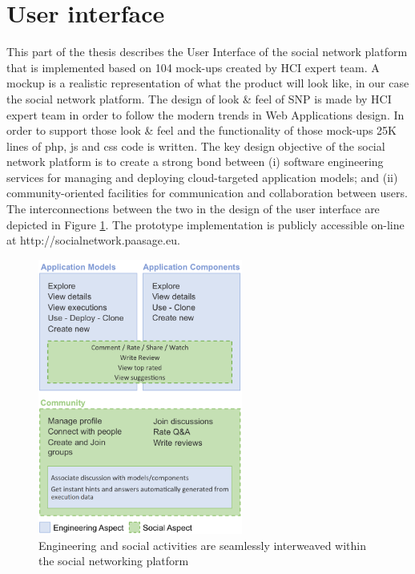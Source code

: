 \section{User interface}
This part of the thesis describes the User Interface of the social network platform that is implemented based on 104 mock-ups created by HCI expert team. A mockup is a realistic representation of what the product will look like, in our case the social network platform. The design of look \& feel of SNP is made by HCI expert team in order to follow the modern trends in Web Applications design. In order to support those look \& feel and the functionality of those mock-ups 25K lines of php, js and css code is written.
The key design objective of the social network platform is to create a strong bond between (i) software engineering services for managing and deploying cloud-targeted application models; and (ii) community-oriented facilities for communication and
collaboration between users. The interconnections between the two in the design of the user interface are depicted in Figure \ref{fig:two_aspects}.
The prototype implementation is publicly accessible on-line at http://socialnetwork.paasage.eu. 

\begin{figure}[h]
	\centering
	\includegraphics[width=0.6\textwidth,natwidth=200,natheight=150]{./fig/two_aspectes.png}
	\caption{Engineering and social activities are seamlessly interweaved within the social networking platform}
	\label{fig:two_aspects}
\end{figure}

